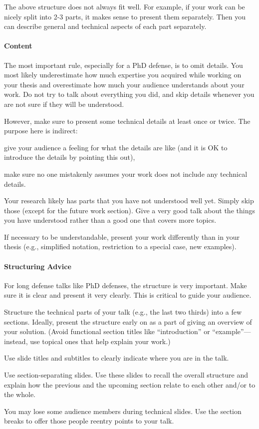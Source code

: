 \documentclass[12pt]{article}
\begin{document}
The above structure does not always fit well.
For example, if your work can be nicely split into 2-3 parts, it makes sense to present them separately.
Then you can describe general and technical aspects of each part separately.

\paragraph{Content}
The most important rule, especially for a PhD defense, is to omit details.
You most likely underestimate how much expertise you acquired while working on your thesis and overestimate how much your audience understands about your work.
Do not try to talk about everything you did, and skip details whenever you are not sure if they will be understood.
\medskip

However, make sure to present some technical details at least once or twice.
The purpose here is indirect:
\begin{compactitem}
 \item give your audience a feeling for what the details are like (and it is OK to introduce the details by pointing this out),
 \item make sure no one mistakenly assumes your work does not include any technical details.
\end{compactitem}
\medskip

Your research likely has parts that you have not understood well yet.
Simply skip those (except for the future work section).
Give a very good talk about the things you have understood rather than a good one that covers more topics.

If necessary to be understandable, present your work differently than in your thesis (e.g., simplified notation, restriction to a special case, new examples).

\paragraph{Structuring Advice}
For long defense talks like PhD defenses, the structure is very important.
Make sure it is clear and present it very clearly.
This is critical to guide your audience.
\begin{compactitem}
\item Structure the technical parts of your talk (e.g., the last two thirds) into a few sections.
 Ideally, present the structure early on as a part of giving an overview of your solution.
 (Avoid functional section titles like ``introduction'' or ``example''---instead, use topical ones that help explain your work.)
\item Use slide titles and subtitles to clearly indicate where you are in the talk. 
\item Use section-separating slides. Use these slides to recall the overall structure and explain how the previous and the upcoming section relate to each other and/or to the whole.
\item You may lose some audience members during technical slides. Use the section breaks to offer those people reentry points to your talk.
\end{compactitem}
\medskip
\end{document}
